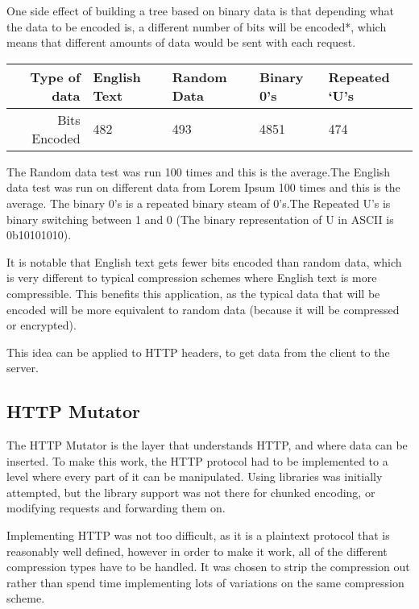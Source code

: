 \newpage
One side effect of building a tree based on binary data is that depending what the data to be encoded is, a different number of bits will be encoded*, which means that different amounts of data would be sent with each request.

\begin{table}[ht]
\begin{tabular}{@{}rllll@{}}
\toprule
Type of data & English Text & Random Data & Binary 0's & Repeated `U's \\ \midrule
Bits Encoded & 482 & 493 & 4851 & 474 \\ \bottomrule
\end{tabular}
\end{table}
{\small * The Random data test was run 100 times and this is the average.The English data test was run on different data from Lorem Ipsum 100 times and this is the average. The binary 0's is a repeated binary steam of 0's.The Repeated U's is binary switching between 1 and 0 (The binary representation of U in ASCII is 0b10101010).}\par
\vspace{0.5cm}
It is notable that English text gets fewer bits encoded than random data, which is very different to typical compression schemes where English text is more compressible. This benefits this application, as the typical data that will be encoded will be more equivalent to random data (because it will be compressed or encrypted).

This idea can be applied to HTTP headers, to get data from the client to the server.

\subsection{HTTP Mutator}
The HTTP Mutator is the layer that understands HTTP, and where data can be inserted.
To make this work, the HTTP protocol had to be implemented to a level where every part of it can be manipulated. Using libraries was initially attempted, but the library support was not there for chunked encoding, or modifying requests and forwarding them on.\par
Implementing HTTP was not too difficult, as it is a plaintext protocol that is reasonably well defined, however in order to make it work, all of the different compression types have to be handled. It was chosen to strip the compression out rather than spend time implementing lots of variations on the same compression scheme.\par

